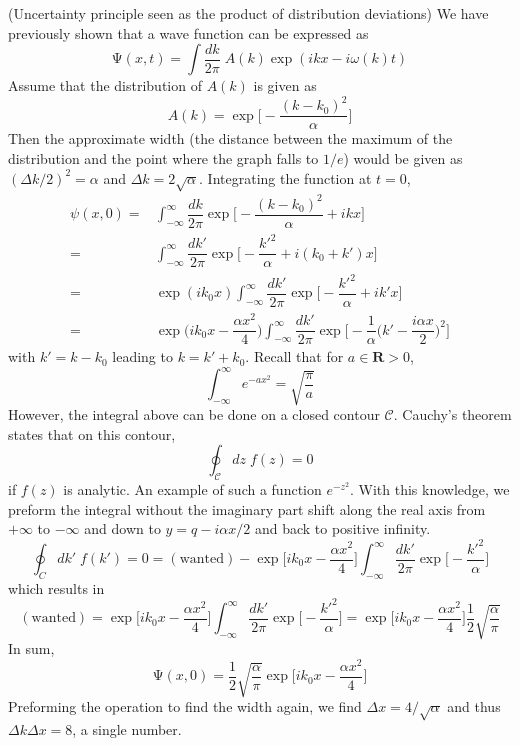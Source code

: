 \begin{thm}
(Uncertainty principle seen as the product of distribution deviations) We have previously shown that a wave function can be expressed as
\[\mathrm{\Psi} (x,t)=\int \dfrac{dk}{2\pi }\;A(k)\exp(ikx-i\omega (k)t)\]
Assume that the distribution of $A(k)$ is given as
\[A(k)= \exp\Big[-\dfrac{(k-k_0)^2}{\alpha }\Big]\]
Then the approximate width (the distance between the maximum of the distribution and the point where the graph falls to $1/e$) would be given as $(\Delta k/2)^2=\alpha $ and $\Delta k=2\sqrt{\alpha }$. Integrating the function at $t=0$, 
\begin{align*}
	\psi  (x,0)=&\int_{-\infty }^{\infty } \dfrac{dk}{2\pi }\exp\Big[-\dfrac{(k-k_0)^2}{\alpha }+ikx\Big]\\
	=&\int _{-\infty }^{\infty }\dfrac{d k'}{2\pi }\exp\Big[-\dfrac{k'^2}{\alpha }+i(k_0+k')x\Big]\\
	=&\exp(ik_0x)\int _{-\infty }^{\infty }\dfrac{dk'}{2\pi }\exp\Big[-\dfrac{ k'^2}{\alpha }+ik'x\Big]\\
=&\exp\Big(ik_{0}x-\dfrac{\alpha x^2}{4}\Big)\int _{-\infty }^{\infty }\dfrac{dk'}{2\pi }\exp\Big[-\dfrac{1}{\alpha }\Big( k'-\dfrac{i\alpha x}{2}\Big)^2\Big]
\end{align*}
with $ k'=k-k_0$ leading to $k= k'+k_0$. Recall that for $a\in {\bm R}>0$,
\[\int _{-\infty }^{\infty }e^{-ax^2}=\sqrt{\dfrac{\pi }{a}}\]
However, the integral above can be done on a closed contour $\mathcal{C}$. Cauchy's theorem states that on this contour,
\[\oint_{\mathcal{C}}dz\;f(z)=0\]
if $f(z)$ is analytic. An example of such a function $e^{-z^2}$. With this knowledge, we preform the integral without the imaginary part shift along the real axis from $+\infty $ to $-\infty $ and down to $y=q-i\alpha x/2$ and back to positive infinity. 
\[\oint_{C}dk'\; f(k')=0=(\mathrm{wanted})-\exp\Big[ik_0x-\dfrac{\alpha x^2}{4}\Big]\int _{-\infty }^{\infty }\dfrac{d k'}{2\pi }\exp\Big[-\dfrac{k'^2}{\alpha }\Big] \]
which results in
\[(\mathrm{wanted})=\exp\Big[ik_0x-\dfrac{\alpha x^2}{4}\Big]\int _{-\infty }^{\infty }\dfrac{dk'}{2\pi }\exp\Big[-\dfrac{k'^2}{\alpha }\Big]=\exp\Big[ik_0x-\dfrac{\alpha x^2}{4}\Big]\dfrac{1}{2}\sqrt{\dfrac{\alpha }{\pi }}\]
In sum,
\[\mathrm{\Psi} (x,0)=\dfrac{1}{2}\sqrt{\dfrac{\alpha }{\pi }}\exp\Big[ik_0x-\dfrac{\alpha x^2}{4}\Big]\]
Preforming the operation to find the width again, we find $\Delta x=4/\sqrt{\alpha }$ and thus $\Delta k\Delta x=8$, a single number. 
\end{thm}
\vspace{2ex}
